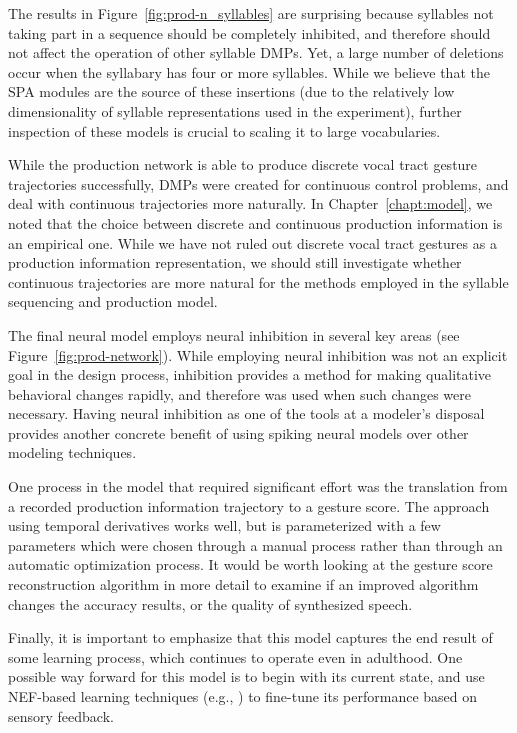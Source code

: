 The results in Figure~\ref{fig:prod-n_syllables}
are surprising because syllables
not taking part in a sequence
should be completely inhibited,
and therefore should not affect the
operation of other syllable DMPs.
Yet, a large number of deletions
occur when the syllabary has
four or more syllables.
While we believe that the SPA modules
are the source of these insertions
(due to the relatively low
dimensionality of syllable representations
used in the experiment),
further inspection of these models
is crucial to scaling it to large vocabularies.

While the production network is able to produce
discrete vocal tract gesture trajectories successfully,
DMPs were created for continuous control problems,
and deal with continuous trajectories
more naturally.
In Chapter~\ref{chapt:model},
we noted that the choice between discrete
and continuous production information
is an empirical one.
While we have not ruled out discrete
vocal tract gestures
as a production information representation,
we should still investigate whether
continuous trajectories are
more natural for the methods
employed in the syllable sequencing and production model.

The final neural model employs neural inhibition
in several key areas
(see Figure~\ref{fig:prod-network}).
While employing neural inhibition was not
an explicit goal in the design process,
inhibition provides a method for
making qualitative behavioral changes rapidly,
and therefore was used when such changes
were necessary.
Having neural inhibition
as one of the tools
at a modeler's disposal
provides another concrete benefit
of using spiking neural models
over other modeling techniques.

One process in the model that
required significant effort
was the translation from
a recorded production information trajectory
to a gesture score.
The approach using temporal derivatives
works well,
but is parameterized with a few parameters
which were chosen through a manual process
rather than through an
automatic optimization process.
It would be worth looking at the
gesture score reconstruction algorithm
in more detail to examine if
an improved algorithm changes
the accuracy results,
or the quality of synthesized speech.

Finally, it is important to emphasize that
this model captures the end result
of some learning process,
which continues to operate
even in adulthood.
One possible way forward for this model
is to begin with its current state,
and use NEF-based learning techniques
(e.g., \citealt{macneil2011,bekolay2013a})
to fine-tune its performance based on
sensory feedback.

